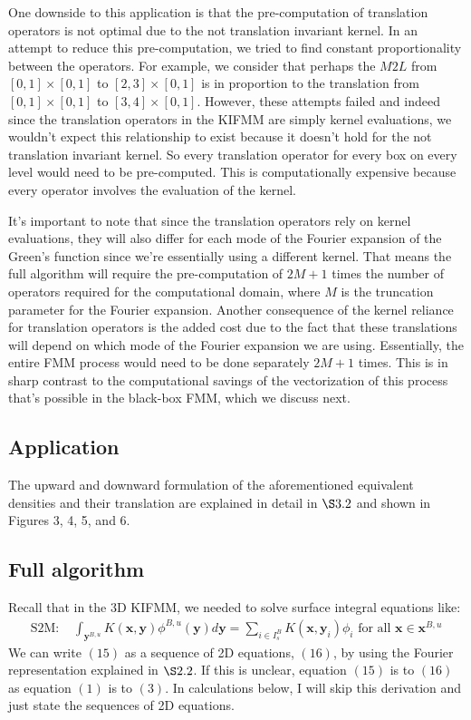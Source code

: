 \documentclass[11pt, oneside]{article}   	%
\begin{document}
One downside to this application is that the pre-computation of translation operators is not optimal due to the not translation invariant kernel. In an attempt to reduce this pre-computation, we tried to find constant proportionality between the operators. For example, we consider that perhaps the $M2L$ from $[0,1]\times[0,1]$ to $[2,3]\times[0,1]$ is in proportion to the translation from $[0,1]\times[0,1]$ to $[3,4]\times[0,1]$. However, these attempts failed and indeed since the translation operators in the KIFMM are simply kernel evaluations, we wouldn't expect this relationship to exist because it doesn't hold for the not translation invariant kernel. So every translation operator for every box on every level would need to be pre-computed. This is computationally expensive because every operator involves the evaluation of the kernel.

It's important to note that since the translation operators rely on kernel evaluations, they will also differ for each mode of the Fourier expansion of the Green's function since we're essentially using a different kernel. That means the full algorithm will require the pre-computation of $2M+1$ times the number of operators required for the computational domain, where $M$ is the truncation parameter for the Fourier expansion. Another consequence of the kernel reliance for translation operators is the added cost due to the fact that these translations will depend on which mode of the Fourier expansion we are using. Essentially, the entire FMM process would need to be done separately $2M+1$ times. This is in sharp contrast to the computational savings of the vectorization of this process that's possible in the black-box FMM, which we discuss next.

\subsection{Application}
The upward and downward formulation of the aforementioned equivalent densities and their translation are explained in detail in $\S3.2$ and shown in Figures 3, 4, 5, and 6.

\subsection{Full algorithm}
Recall that in the 3D KIFMM, we needed to solve surface integral equations like:
\begin{align}
\mbox{S2M: }&\int_{\mathbf{y}^{B,u}}{K(\mathbf{x},\mathbf{y})}\phi^{B,u}{(\mathbf{y})}d\mathbf{y}=\sum\limits_{i\in I_s^B} K(\mathbf{x},\mathbf{y}_i)\phi_i\mbox{ for all }\mathbf{x}\in\mathbf{x}^{B,u}
\end{align}
We can write $(15)$ as a sequence of 2D equations, $(16)$, by using the Fourier representation explained in $\S2.2$. If this is unclear, equation $(15)$ is to $(16)$ as equation $(1)$ is to $(3)$. In calculations below, I will skip this derivation and just state the sequences of 2D equations.
\end{document}
